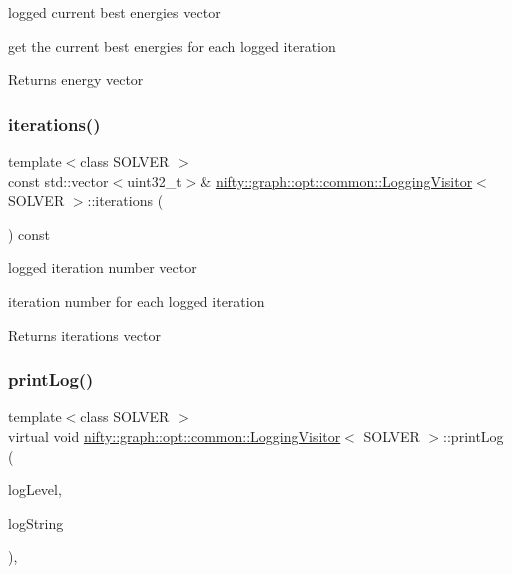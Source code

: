 logged current best energies vector 

get the current best energies for each logged iteration \begin{DoxyReturn}{Returns}
energy vector 
\end{DoxyReturn}
\mbox{\label{classnifty_1_1graph_1_1opt_1_1common_1_1LoggingVisitor_a7bfbbd9384969ab69e3ac7dcdb0481b3}} 
\subsubsection{\texorpdfstring{iterations()}{iterations()}}
{\footnotesize\ttfamily template$<$class S\+O\+L\+V\+ER $>$ \\
const std\+::vector$<$uint32\+\_\+t$>$\& \hyperlink{classnifty_1_1graph_1_1opt_1_1common_1_1LoggingVisitor}{nifty\+::graph\+::opt\+::common\+::\+Logging\+Visitor}$<$ S\+O\+L\+V\+ER $>$\+::iterations (\begin{DoxyParamCaption}{ }\end{DoxyParamCaption}) const\hspace{0.3cm}{\ttfamily [inline]}}



logged iteration number vector 

iteration number for each logged iteration \begin{DoxyReturn}{Returns}
iterations vector 
\end{DoxyReturn}
\mbox{\label{classnifty_1_1graph_1_1opt_1_1common_1_1LoggingVisitor_a516caf5c8a5c5378ef5d5d62d920142c}} 
\subsubsection{\texorpdfstring{print\+Log()}{printLog()}}
{\footnotesize\ttfamily template$<$class S\+O\+L\+V\+ER $>$ \\
virtual void \hyperlink{classnifty_1_1graph_1_1opt_1_1common_1_1LoggingVisitor}{nifty\+::graph\+::opt\+::common\+::\+Logging\+Visitor}$<$ S\+O\+L\+V\+ER $>$\+::print\+Log (\begin{DoxyParamCaption}\item[{const \hyperlink{namespacenifty_1_1logging_a3385625f9a0dbb17f70c47d3fca2f64d}{nifty\+::logging\+::\+Log\+Level}}]{log\+Level,  }\item[{const std\+::string \&}]{log\+String }\end{DoxyParamCaption})\hspace{0.3cm}{\ttfamily [inline]}, {\ttfamily [virtual]}}



